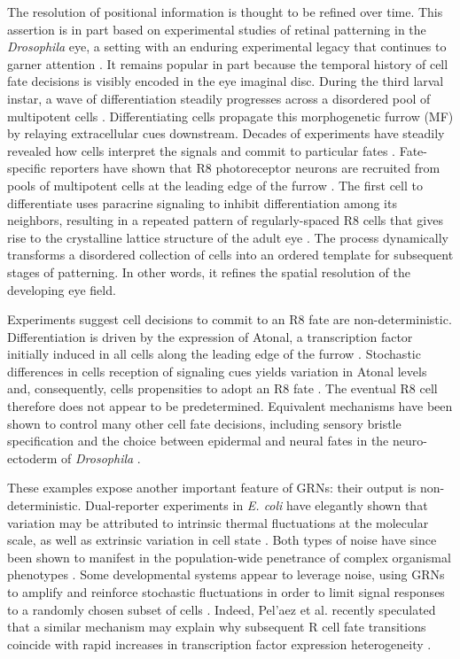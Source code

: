 The resolution of positional information is thought to be refined over time. This assertion is in part based on experimental studies of retinal patterning in the \textit{Drosophila} eye, a setting with an enduring experimental legacy that continues to garner attention \cite{Bellen2010,Beira2016}. It remains popular in part because the temporal history of cell fate decisions is visibly encoded in the eye imaginal disc. During the third larval instar, a wave of differentiation steadily progresses across a disordered pool of multipotent cells \cite{Ready1976a,Tomlinson1987a}. Differentiating cells propagate this morphogenetic furrow (MF) by relaying extracellular cues downstream. Decades of experiments have steadily revealed how cells interpret the signals and commit to particular fates \cite{Voas2004}. Fate-specific reporters have shown that R8 photoreceptor neurons are recruited from pools of multipotent cells at the leading edge of the furrow \cite{Jarman1994}. The first cell to differentiate uses paracrine signaling to inhibit differentiation among its neighbors, resulting in a repeated pattern of regularly-spaced R8 cells that gives rise to the crystalline lattice structure of the adult eye \cite{Frankfort2002a}. The process dynamically transforms a disordered collection of cells into an ordered template for subsequent stages of patterning. In other words, it refines the spatial resolution of the developing eye field.

Experiments suggest cell decisions to commit to an R8 fate are non-deterministic. Differentiation is driven by the expression of Atonal, a transcription factor initially induced in all cells along the leading edge of the furrow \cite{Jarman1994,Baker1997,Hsiung2002}. Stochastic differences in cells reception of signaling cues yields variation in Atonal levels and, consequently, cells propensities to adopt an R8 fate \cite{Baker1990,Gavish2016}. The eventual R8 cell therefore does not appear to be predetermined. Equivalent mechanisms have been shown to control many other cell fate decisions, including sensory bristle specification and the choice between epidermal and neural fates in the neuro-ectoderm of \textit{Drosophila} \cite{Ghysen1993,Simpson1997}.

These examples expose another important feature of GRNs: their output is non-deterministic. Dual-reporter experiments in \emph{E. coli} have elegantly shown that variation may be attributed to intrinsic thermal fluctuations at the molecular scale, as well as extrinsic variation in cell state \cite{Elowitz2002}. Both types of noise have since been shown to manifest in the population-wide penetrance of complex organismal phenotypes \cite{Raj2010,Paulsen2011,Burga2011,Colman-Lerner2005}. Some developmental systems appear to leverage noise, using GRNs to amplify and reinforce stochastic fluctuations in order to limit signal responses to a randomly chosen subset of cells \cite{Baker1990,Ghysen1993,Simpson1997}. Indeed, Pel'{a}ez et al. recently speculated that a similar mechanism may explain why subsequent R cell fate transitions coincide with rapid increases in transcription factor expression heterogeneity \cite{Pelaez2015a}.

